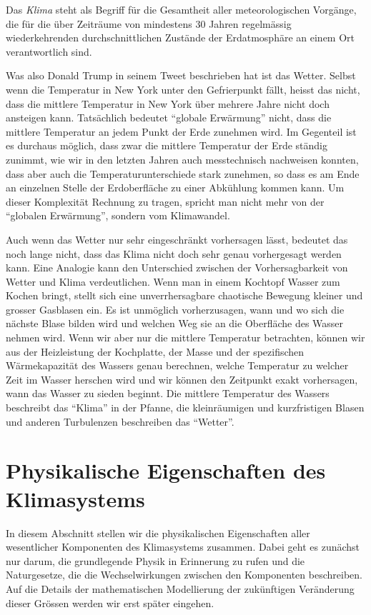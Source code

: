 \begin{definition}
Das {\em Klima} steht als Begriff für die Gesamtheit aller meteorologischen
Vorgänge, die für die über Zeiträume von mindestens 30 Jahren
regelmässig wiederkehrenden durchschnittlichen Zustände der Erdatmosphäre
an einem Ort verantwortlich sind.
\cite{skript:klima}
\end{definition}

Was also Donald Trump in seinem Tweet beschrieben hat ist das Wetter.
Selbst wenn die Temperatur in New York unter den Gefrierpunkt fällt, 
heisst das nicht, dass die mittlere Temperatur in New York über mehrere
Jahre nicht doch ansteigen kann.
Tatsächlich bedeutet ``globale Erwärmung'' nicht, dass die mittlere
Temperatur an jedem Punkt der Erde zunehmen wird.
Im Gegenteil ist es durchaus möglich, dass zwar die mittlere Temperatur
der Erde ständig zunimmt, wie wir in den letzten Jahren auch messtechnisch
nachweisen konnten, dass aber auch die Temperaturunterschiede stark zunehmen,
so dass es am Ende an einzelnen Stelle der Erdoberfläche zu einer 
Abkühlung kommen kann.
Um dieser Komplexität Rechnung zu tragen, spricht man nicht mehr von
der ``globalen Erwärmung'', sondern vom Klimawandel.

Auch wenn das Wetter nur sehr eingeschränkt vorhersagen lässt,
bedeutet das noch lange nicht, dass das Klima nicht doch sehr
genau vorhergesagt werden kann.
Eine Analogie kann den Unterschied zwischen der Vorhersagbarkeit
von Wetter und Klima verdeutlichen.
Wenn man in einem Kochtopf Wasser zum Kochen bringt, stellt sich
eine unverrhersagbare chaotische Bewegung kleiner und grosser
Gasblasen ein.
Es ist unmöglich vorherzusagen, wann und wo sich die nächste Blase
bilden wird und welchen Weg sie an die Oberfläche des Wasser nehmen
wird.
Wenn wir aber nur die mittlere Temperatur betrachten, können wir
aus der Heizleistung der Kochplatte, der Masse und der spezifischen
Wärmekapazität des Wassers genau berechnen, welche Temperatur zu welcher
Zeit im Wasser herschen wird und wir können den Zeitpunkt exakt
vorhersagen, wann das Wasser zu sieden beginnt.
Die mittlere Temperatur des Wassers beschreibt das ``Klima''
in der Pfanne, die kleinräumigen und kurzfristigen Blasen und anderen
Turbulenzen beschreiben das ``Wetter''.

\section{Physikalische Eigenschaften des Klimasystems}
In diesem Abschnitt stellen wir die physikalischen Eigenschaften
aller wesentlicher Komponenten des Klimasystems zusammen.
Dabei geht es zunächst nur darum, die grundlegende Physik in 
Erinnerung zu rufen und die Naturgesetze, die die Wechselwirkungen
zwischen den Komponenten beschreiben.
Auf die Details der mathematischen Modellierung der zukünftigen
Veränderung dieser Grössen werden wir erst später eingehen.

